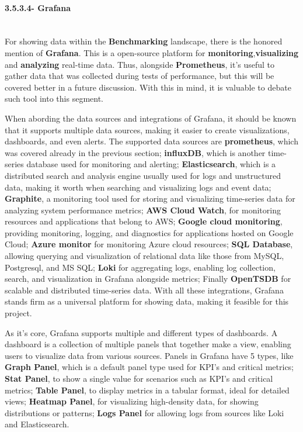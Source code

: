 \paragraph{3.5.3.4- Grafana}\mbox{}\\
For showing data within the \textbf{Benchmarking} landscape, there is the honored mention of \textbf{Grafana}. This is a open-source platform for \textbf{monitoring},\textbf{visualizing} and \textbf{analyzing} real-time data. Thus, alongside \textbf{Prometheus}, it's useful to gather data that was collected during tests of performance, but this will be covered better in a future discussion. With this in mind, it is valuable to debate such tool into this segment.

When abording the data sources and integrations of Grafana, it should be known that it supports multiple data sources, making it easier to create visualizations, dashboards, and even alerts. The supported data sources are \textbf{prometheus}, which was covered already in the previous section; \textbf{influxDB}, which is another time-series database used for monitoring and alerting; \textbf{Elasticsearch}, which is a distributed search and analysis engine usually used for logs and unstructured data, making it worth when searching and visualizing logs and event data; \textbf{Graphite}, a monitoring tool used for storing and visualizing time-series data for analyzing system performance metrics; \textbf{AWS Cloud Watch}, for monitoring resources and applications that belong to AWS; \textbf{Google cloud monitoring}, providing monitoring, logging, and diagnostics for applications hosted on Google Cloud; \textbf{Azure monitor} for monitoring Azure cloud resources; \textbf{SQL Database}, allowing querying and visualization of relational data like those from MySQL, Postgresql, and MS SQL; \textbf{Loki} for aggregating logs, enabling log collection, search, and visualization in Grafana alongside metrics; Finally \textbf{OpenTSDB} for scalable and distributed time-series data. With all these integrations, Grafana stands firm as a universal platform for showing data, making it feasible for this project.

As it's core, Grafana supports multiple and different types of dashboards. A dashboard is a collection of multiple panels that together make a view, enabling users to visualize data from various sources. Panels in Grafana have 5 types, like \textbf{Graph Panel}, which is a default panel type used for KPI's and critical metrics; \textbf{Stat Panel}, to show a single value for scenarios such as KPI's and critical metrics; \textbf{Table Panel}, to display metrics in a tabular format, ideal for detailed views; \textbf{Heatmap Panel}, for visualizing high-density data, for showing distributions or patterns; \textbf{Logs Panel} for allowing logs from sources like Loki and Elasticsearch.


